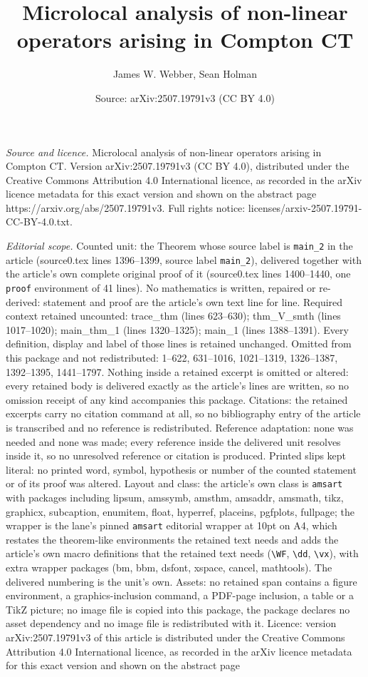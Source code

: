 \documentclass[10pt,a4paper]{amsart}
\title[Microlocal analysis of non-linear operators arising in Compt]{Microlocal analysis of non-linear operators arising in Compton CT}
\author{James W. Webber, Sean Holman}
\date{Source: arXiv:2507.19791v3 (CC BY 4.0)}
\begin{document}
\maketitle

\noindent\emph{Source and licence.} Microlocal analysis of non-linear operators arising in Compton CT. Version arXiv:2507.19791v3 (CC BY 4.0), distributed under the Creative Commons Attribution 4.0 International licence, as recorded in the arXiv licence metadata for this exact version and shown on the abstract page https://arxiv.org/abs/2507.19791v3. Full rights notice: licenses/arxiv-2507.19791-CC-BY-4.0.txt.\par\smallskip

\noindent\textit{Editorial scope.} Counted unit: the Theorem whose source label is \texttt{main\_2} in the article (source0.tex lines 1396--1399, source label \texttt{main\_2}), delivered together with the article's own complete original proof of it (source0.tex lines 1400--1440, one \texttt{proof} environment of 41 lines). No mathematics is written, repaired or re-derived: statement and proof are the article's own text line for line. Required context retained uncounted: trace\_thm (lines 623--630); thm\_V\_smth (lines 1017--1020); main\_thm\_1 (lines 1320--1325); main\_1 (lines 1388--1391). Every definition, display and label of those lines is retained unchanged. Omitted from this package and not redistributed: 1--622, 631--1016, 1021--1319, 1326--1387, 1392--1395, 1441--1797. Nothing inside a retained excerpt is omitted or altered: every retained body is delivered exactly as the article's lines are written, so no omission receipt of any kind accompanies this package. Citations: the retained excerpts carry no citation command at all, so no bibliography entry of the article is transcribed and no reference is redistributed. Reference adaptation: none was needed and none was made; every reference inside the delivered unit resolves inside it, so no unresolved reference or citation is produced. Printed slips kept literal: no printed word, symbol, hypothesis or number of the counted statement or of its proof was altered. Layout and class: the article's own class is \texttt{amsart} with packages including lipsum, amssymb, amsthm, amsaddr, amsmath, tikz, graphicx, subcaption, enumitem, float, hyperref, placeins, pgfplots, fullpage; the wrapper is the lane's pinned \texttt{amsart} editorial wrapper at 10pt on A4, which restates the theorem-like environments the retained text needs and adds the article's own macro definitions that the retained text needs (\texttt{\textbackslash WF}, \texttt{\textbackslash dd}, \texttt{\textbackslash vx}), with extra wrapper packages (bm, bbm, dsfont, xspace, cancel, mathtools). The delivered numbering is the unit's own. Assets: no retained span contains a figure environment, a graphics-inclusion command, a PDF-page inclusion, a table or a TikZ picture; no image file is copied into this package, the package declares no asset dependency and no image file is redistributed with it. Licence: version arXiv:2507.19791v3 of this article is distributed under the Creative Commons Attribution 4.0 International licence, as recorded in the arXiv licence metadata for this exact version and shown on the abstract page 
\end{document}
